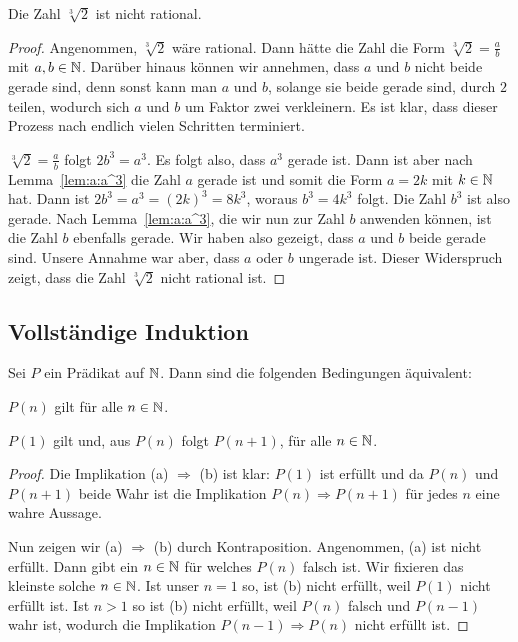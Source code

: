 \begin{thm}
	Die Zahl $\sqrt[3]{2}$ ist nicht rational. 
\end{thm} 
\begin{proof} 
	Angenommen, $\sqrt[3]{2}$ wäre rational. Dann hätte die Zahl die Form $\sqrt[3]{2} = \frac{a}{b}$ mit $a, b \in \mathbb{N}$. Darüber hinaus können wir annehmen, dass $a$ und $b$ nicht beide gerade sind, denn sonst kann man $a$ und $b$, solange sie beide gerade sind, durch $2$ teilen, wodurch sich $a$ und $b$ um Faktor zwei verkleinern. Es ist klar, dass dieser Prozess nach endlich vielen Schritten terminiert. 
	
	$\sqrt[3]{2} = \frac{a}{b}$ folgt $2 b^3  = a^3$. Es folgt also, dass $a^3$ gerade ist. Dann ist aber nach Lemma~\ref{lem:a:a^3} die Zahl $a$ gerade ist und somit die Form $a = 2 k$ mit $k \in \mathbb{N}$ hat. Dann ist $2 b^3 = a^3 = (2k)^3 = 8 k^3$, woraus $b^3= 4 k^3$ folgt. Die Zahl $b^3$ ist also gerade. Nach Lemma~\ref{lem:a:a^3}, die wir nun zur Zahl $b$ anwenden können, ist die Zahl $b$ ebenfalls gerade. Wir haben also gezeigt, dass $a$ und $b$ beide gerade sind. Unsere Annahme war aber, dass $a$ oder $b$ ungerade ist. Dieser Widerspruch zeigt, dass die Zahl $\sqrt[3]{2}$ nicht rational ist. 
\end{proof} 


\subsection{Vollständige Induktion} 

\begin{thm} \label{thm:ind}
	Sei $P$ ein Prädikat auf $\mathbb{N}$. Dann sind die folgenden Bedingungen äquivalent: 
	\begin{enuma}
			\item $P(n)$ gilt für alle $n \in \mathbb{N}$. 
			\item  $P(1)$ gilt und, aus $P(n)$ folgt $P(n+1)$, für alle $n \in \mathbb{N}$. 
	\end{enuma} 
\end{thm} 
\begin{proof} 
	Die Implikation (a) $\Rightarrow$ (b) ist klar: $P(1)$ ist erfüllt und da $P(n)$ und $P(n+1)$ beide Wahr ist die Implikation $P(n) \Rightarrow P(n+1)$ für jedes $n$ eine wahre Aussage. 
	
	Nun zeigen wir (a) $\Rightarrow$ (b) durch Kontraposition. Angenommen, (a) ist nicht erfüllt. Dann gibt ein $n \in \mathbb{N}$ für welches $P(n)$ falsch ist. Wir fixieren das kleinste solche $n \in \mathbb{N}$. Ist unser $n=1$ so, ist (b) nicht erfüllt, weil $P(1)$ nicht erfüllt ist. Ist $n>1$ so ist (b) nicht erfüllt, weil $P(n)$ falsch und $P(n-1)$ wahr ist, wodurch die Implikation $P(n-1) \Rightarrow P(n)$ nicht erfüllt ist. 
\end{proof} 

